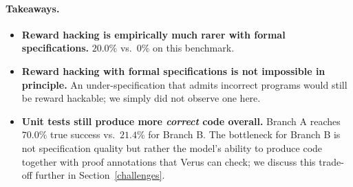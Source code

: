 \begin{figure}[h]

\end{figure}

\begin{figure}[h]

\end{figure}

\paragraph{Takeaways.}
\begin{itemize}
\item \textbf{Reward hacking is empirically much rarer with formal specifications.}
  $20.0\%$ vs.\ $0\%$ on this benchmark.
\item \textbf{Reward hacking with formal specifications is not impossible in principle.}
  An under-specification that admits incorrect programs would still be reward
  hackable; we simply did not observe one here.
\item \textbf{Unit tests still produce more \emph{correct} code overall.} Branch
  A reaches $70.0\%$ true success vs.\ $21.4\%$ for Branch B. The bottleneck for
  Branch B is not specification quality but rather the model's ability to
  produce code together with proof annotations that Verus can check; we discuss
  this trade-off further in Section~\ref{challenges}.
\end{itemize}

